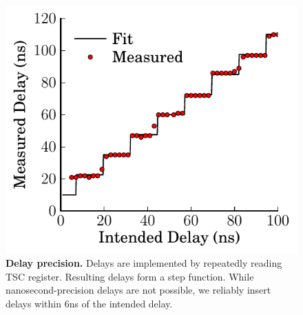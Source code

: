 \begin{figure}
  \centering
  \includegraphics[width=.50\linewidth]{OLTP_eval/Delay.pdf}
  \caption{\textbf{Delay precision.} Delays are implemented by repeatedly reading TSC register.  Resulting delays form a step function.  While nanosecond-precision delays are not possible, we reliably insert delays within 6ns of the intended delay.}
  \label{fig::Delay}
\end{figure}
